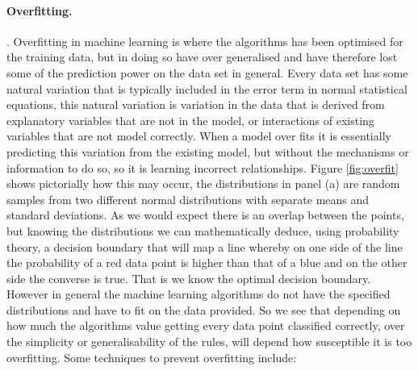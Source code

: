 \paragraph{Overfitting.} \parencite{chollet_allaire_2018}. Overfitting in machine learning is where the algorithms has been optimised for the training data, but in doing so have over generalised and have therefore lost some of the prediction power on the data set in general. Every data set has some natural variation that is typically included in the error term in normal statistical equations, this natural variation is variation in the data that is derived from explanatory variables that are not in the model, or interactions of existing variables that are not model correctly. When a model over fits it is essentially predicting this variation from the existing model, but without the mechanisms or information to do so, so it is learning incorrect relationships. Figure \ref{fig:overfit} shows pictorially how this may occur, the distributions in panel (a) are random samples from two different normal distributions with separate means and standard deviations. As we would expect there is an overlap between the points, but knowing the distributions we can mathematically deduce, using probability theory, a decision boundary that will map a line whereby on one side of the line the probability of a red data point is higher than that of a blue and on the other side the converse is true. That is we know the optimal decision boundary. However in general the machine learning algorithms do not have the specified distributions and have to fit on the data provided. So we see that depending on how much the algorithms value getting every data point classified correctly, over the simplicity or generalisability of the rules, will depend how susceptible it is too overfitting. Some techniques to prevent overfitting include:
